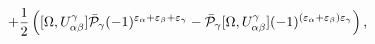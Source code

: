 \begin{equation}
+\frac{1}{2}\left([\Omega,U^\gamma_{\alpha\beta}]\bar{\cal P}_\gamma
(-1)^{\varepsilon_\alpha+\varepsilon_\beta+\varepsilon_\gamma}-
\bar{\cal P}_\gamma [\Omega,U^\gamma_{\alpha\beta}]
(-1)^{(\varepsilon_\alpha+\varepsilon_\beta)\varepsilon_\gamma}\right),
\label{5.4}
\end{equation}

